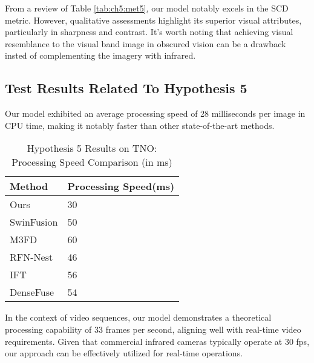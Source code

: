 From a review of Table \ref{tab:ch5:met5}, our model notably excels in the SCD\cite{aslantas2015new} metric. However, qualitative assessments highlight its superior visual attributes, particularly in sharpness and contrast. It's worth noting that achieving visual resemblance to the visual band image in obscured vision can be a drawback insted of complementing the imagery with infrared.

\subsection{Test Results Related To Hypothesis 5} \label{subsec:met7res}

Our model exhibited an average processing speed of 28 milliseconds per image in CPU time, making it notably faster than other state-of-the-art methods.

\begin{table}[htbp]
    \centering
    \caption{Hypothesis 5 Results on TNO: Processing Speed Comparison (in ms)}
    \label{tab:ch5:met7speed}
    \begin{tabular}{|l|l|}
        \hline
        \textbf{Method} & \textbf{Processing Speed\footnotemark (ms)} \\
        \hline
        Ours & 30 \\
        SwinFusion\cite{ma2022swinfusion} & 50 \\
        M3FD\cite{liu2022target} & 60 \\
        RFN-Nest\cite{li2021rfn} & 46 \\
        IFT\cite{vs2022image} & 56 \\
        DenseFuse\cite{li2019infrared} & 54 \\
        \hline
    \end{tabular}
\end{table}


In the context of video sequences, our model demonstrates a theoretical processing capability of 33 frames per second, aligning well with real-time video requirements. Given that commercial infrared cameras typically operate at 30 fps, our approach can be effectively utilized for real-time operations.

